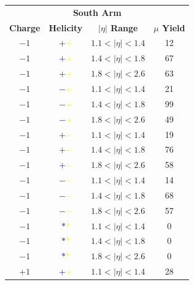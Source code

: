 \begin{table}
  \centering
  \begin{tabular}{cccc}
    \toprule
    \multicolumn{4}{c}{\textbf{South Arm}} \\ 
    \textbf{Charge} & 
    \textbf{Helicity} & 
    \textbf{$\vert\eta\vert$ Range} &
    \textbf{$\mu$ Yield} \\ 
    \midrule
    $-1$ &\textbf{\textcolor{blue}{$+$}\textcolor{yellow}{$+$}} & $1.1 <\vert\eta\vert< 1.4$ & 12 \\
    $-1$ &\textbf{\textcolor{blue}{$+$}\textcolor{yellow}{$+$}} & $1.4 <\vert\eta\vert< 1.8$ & 67 \\
    $-1$ &\textbf{\textcolor{blue}{$+$}\textcolor{yellow}{$+$}} & $1.8 <\vert\eta\vert< 2.6$ & 63 \\
    $-1$ &\textbf{\textcolor{blue}{$-$}\textcolor{yellow}{$+$}} & $1.1 <\vert\eta\vert< 1.4$ & 21 \\
    $-1$ &\textbf{\textcolor{blue}{$-$}\textcolor{yellow}{$+$}} & $1.4 <\vert\eta\vert< 1.8$ & 99 \\
    $-1$ &\textbf{\textcolor{blue}{$-$}\textcolor{yellow}{$+$}} & $1.8 <\vert\eta\vert< 2.6$ & 49 \\
    $-1$ &\textbf{\textcolor{blue}{$+$}\textcolor{yellow}{$-$}} & $1.1 <\vert\eta\vert< 1.4$ & 19 \\
    $-1$ &\textbf{\textcolor{blue}{$+$}\textcolor{yellow}{$-$}} & $1.4 <\vert\eta\vert< 1.8$ & 76 \\
    $-1$ &\textbf{\textcolor{blue}{$+$}\textcolor{yellow}{$-$}} & $1.8 <\vert\eta\vert< 2.6$ & 58 \\
    $-1$ &\textbf{\textcolor{blue}{$-$}\textcolor{yellow}{$-$}} & $1.1 <\vert\eta\vert< 1.4$ & 14 \\
    $-1$ &\textbf{\textcolor{blue}{$-$}\textcolor{yellow}{$-$}} & $1.4 <\vert\eta\vert< 1.8$ & 68 \\
    $-1$ &\textbf{\textcolor{blue}{$-$}\textcolor{yellow}{$-$}} & $1.8 <\vert\eta\vert< 2.6$ & 57 \\
    $-1$ &\textbf{\textcolor{blue}{$*$}\textcolor{yellow}{$*$}} & $1.1 <\vert\eta\vert< 1.4$ & 0 \\
    $-1$ &\textbf{\textcolor{blue}{$*$}\textcolor{yellow}{$*$}} & $1.4 <\vert\eta\vert< 1.8$ & 0 \\
    $-1$ &\textbf{\textcolor{blue}{$*$}\textcolor{yellow}{$*$}} & $1.8 <\vert\eta\vert< 2.6$ & 0 \\
    $+1$ &\textbf{\textcolor{blue}{$+$}\textcolor{yellow}{$+$}} & $1.1 <\vert\eta\vert< 1.4$ & 28 \\

\end{tabular}
\end{table}
